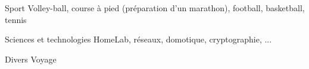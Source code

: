 

\begin{cvskills}

  \cvskill
    {Sport} %
    {Volley-ball, course à pied (préparation d'un marathon), football, basketball, tennis} %

\cvskill
{Sciences et technologies} %
{HomeLab, réseaux, domotique, cryptographie, ...} %

\cvskill
{Divers} %
{Voyage} %


\end{cvskills}
